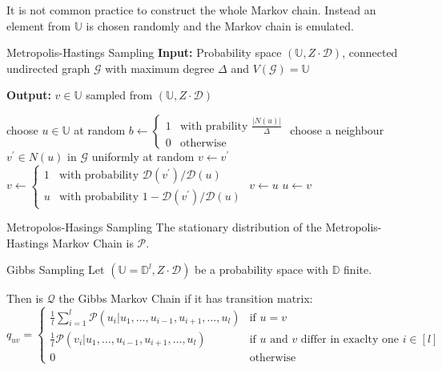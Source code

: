 \documentclass[english]{panikzettel}
\begin{document}
It is not common practice to construct the whole Markov chain. Instead an element from $\mathbb{U}$ is chosen randomly and the Markov chain is emulated.

\begin{algo}{Metropolis-Hastings Sampling}
\textbf{Input:} Probability space $(\mathbb{U}, Z \cdot \mathcal{D})$, connected undirected graph $\mathcal{G}$ with maximum degree $\Delta$ and $V(\mathcal{G}) = \mathbb{U}$

\textbf{Output:} $v \in \mathbb{U}$ sampled from $(\mathbb{U}, Z \cdot \mathcal{D})$
\tcblower
\begin{algorithmic}[1]
\State choose $u \in \mathbb{U}$ at random
  \State $b \leftarrow \begin{cases}1 & \text{with prability } \frac{|N(u)|}{\Delta} \\ 0 & \text{otherwise} \end{cases}$
    \State choose a neighbour $v^\prime \in N(u)$ in $\mathcal{G}$ uniformly at random
      \State $v \leftarrow v^\prime$
    \Else
      \State $v \leftarrow \begin{cases}1 & \text{with probability } \mathcal{D}(v^\prime) / \mathcal{D}(u) \\ u & \text{with probability } 1 - \mathcal{D}(v^\prime) / \mathcal{D}(u) \end{cases}$
    \EndIf
  \Else
    \State $v \leftarrow u$
  \EndIf
  \State $u \leftarrow v$
\EndFor
\State {}
\end{algorithmic}
\end{algo}

\begin{theo}{Metropolos-Hasings Sampling}
The stationary distribution of the Metropolis-Hastings Markov Chain is $\mathcal{P}$.
\end{theo}

\begin{defi}{Gibbs Sampling}
Let $(\mathbb{U} = \mathbb{D}^l, Z \cdot \mathcal{D})$ be a probability space with $\mathbb{D}$ finite.

Then is $\mathcal{Q}$ the Gibbs Markov Chain if it has transition matrix:
$$
q_{uv} =
\begin{cases}
\frac{1}{l} \sum_{i=1}^l \mathcal{P}(u_i| u_1, \ldots, u_{i-1}, u_{i+1}, \ldots, u_l) & \text{if } u = v \\
\frac{1}{l} \mathcal{P}(v_i| u_1, \ldots, u_{i-1}, u_{i+1}, \ldots, u_l) & \text{if $u$ and $v$ differ in exaclty one } i \in [l] \\
0 & \text{otherwise}
\end{cases}
$$
\end{defi}
\end{document}
